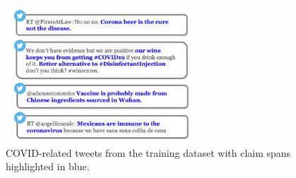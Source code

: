 \documentclass[11pt]{article}
\begin{document}
\begin{figure}[H]
    \centering
    \includegraphics[width=7cm]{images/4-tweets.png}
    \caption{COVID-related tweets from the training dataset with claim spans highlighted in blue.}
    \label{fig appendix: 4-tweets}
\end{figure}
\end{document}
